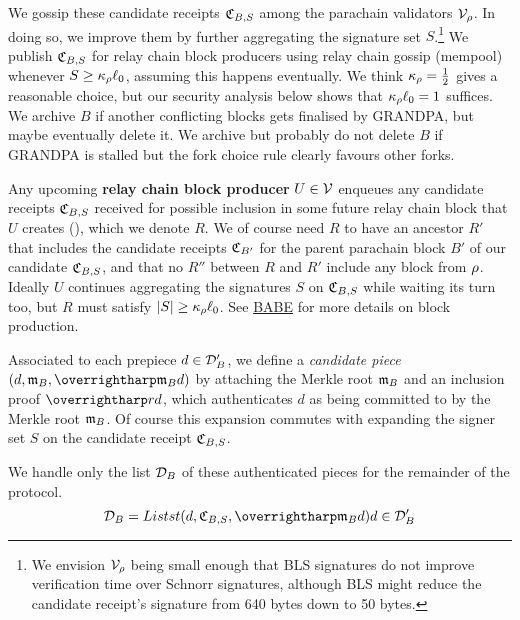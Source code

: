 We gossip these candidate receipts $\mathfrak{C}_{B,S}$ among the parachain validators $\mathcal{V}_{\rho}$.  In doing so, we improve them by further aggregating the signature set $S$.\footnote{We envision $\mathcal{V}_{\rho}$ being small enough that BLS signatures do not improve verification time over Schnorr signatures, although BLS might reduce the candidate receipt's signature from 640 bytes down to 50 bytes.}  We publish $\mathfrak{C}_{B,S}$ for relay chain block producers using relay chain gossip (mempool) whenever $S \ge \kappa_{\rho} \ell_0$, assuming this happens eventually.  We think $\kappa_{\rho} = {1\over2}$ gives a reasonable choice, but our security analysis below shows that $\kappa_{\rho} \ell_0 = 1$ suffices.  We archive $B$ if another conflicting blocks gets finalised by GRANDPA, but maybe eventually delete it.  We archive but probably do not delete $B$ if GRANDPA is stalled but the fork choice rule clearly favours other forks.  

\smallskip

Any upcoming {\bf relay chain block producer} $U \in \mathcal{V}$ enqueues any candidate receipts $\mathfrak{C}_{B,S}$ received for possible inclusion in some future relay chain block that $U$ creates (), which we denote $R$.  We of course need $R$ to have an ancestor $R'$ that includes the candidate receipts $\mathfrak{C}_{B'}$ for the parent parachain block $B'$ of our candidate $\mathfrak{C}_{B,S}$, and that no $R''$ between $R$ and $R'$ include any block from $\rho$.  Ideally $U$ continues aggregating the signatures $S$ on $\mathfrak{C}_{B,S}$ while waiting its turn too, but $R$ must satisfy $|S| \ge \kappa_{\rho} \ell_0$.  See \href{http://research.web3.foundation/en/latest/polkadot/BABE/Babe/}{BABE} for more details on block production.

Associated to each prepiece $d \in \mathcal{D}'_B$, we define a {\em candidate piece} $(d,\merkleroot_B,\vect{\merkleroot_B d})$ by attaching the Merkle root $\mathfrak{m}_B$ and an inclusion proof $\vect{rd}$, which authenticates $d$ as being committed to by the Merkle root $\mathfrak{m}_B$.  Of course this expansion commutes with expanding the signer set $S$ on the candidate receipt $\mathfrak{C}_{B,S}$.

We handle only the list $\mathcal{D}_B$ of these authenticated pieces for the remainder of the protocol. 
$$ \pieces_B = Listst{ (d,\reciept_{B,S},\vect{\merkleroot_B d}) }{ d \in \prepieces_B } $$

